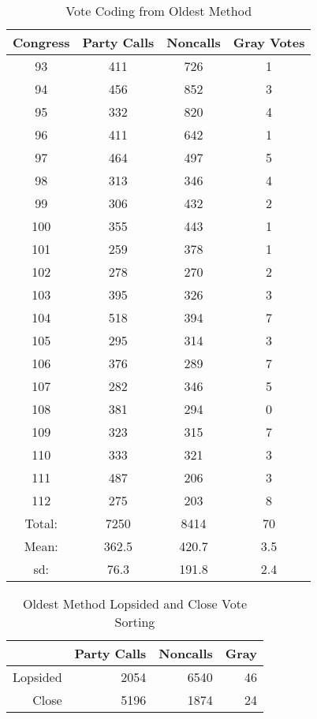 \documentclass[12pt]{article}
\begin{document}
\begin{table}[ht]
	\caption{Vote Coding from Oldest Method}
	\centering
	\begin{tabular}{cccc}
		\hline
		Congress & Party Calls & Noncalls & Gray Votes \\ 
		\hline
		93 & 411 & 726 &   1 \\ 
		94 & 456 & 852 &   3 \\ 
		95 & 332 & 820 &   4 \\ 
		96 & 411 & 642 &   1 \\ 
		97 & 464 & 497 &   5 \\ 
		98 & 313 & 346 &   4 \\ 
		99 & 306 & 432 &   2 \\ 
		100 & 355 & 443 &   1 \\ 
		101 & 259 & 378 &   1 \\ 
		102 & 278 & 270 &   2 \\ 
		103 & 395 & 326 &   3 \\ 
		104 & 518 & 394 &   7 \\ 
		105 & 295 & 314 &   3 \\ 
		106 & 376 & 289 &   7 \\ 
		107 & 282 & 346 &   5 \\ 
		108 & 381 & 294 &   0 \\ 
		109 & 323 & 315 &   7 \\ 
		110 & 333 & 321 &   3 \\ 
		111 & 487 & 206 &   3 \\ 
		112 & 275 & 203 &   8 \\ 
		\hline
		Total: & 7250 & 8414 & 70 \\
		Mean: & 362.5 & 420.7 & 3.5 \\
		sd: & 76.3 & 191.8 & 2.4 \\
		\hline
	\end{tabular}
\end{table}

\begin{table}[ht]
	\caption{Oldest Method Lopsided and Close Vote Sorting}
	\centering
	\begin{tabular}{rrrr}
		\hline
		& Party Calls & Noncalls & Gray \\ 
		\hline
		Lopsided &  2054 & 6540 & 46 \\ 
		Close & 5196  & 1874 & 24 \\ 
		\hline
	\end{tabular}
\end{table}
\end{document}
